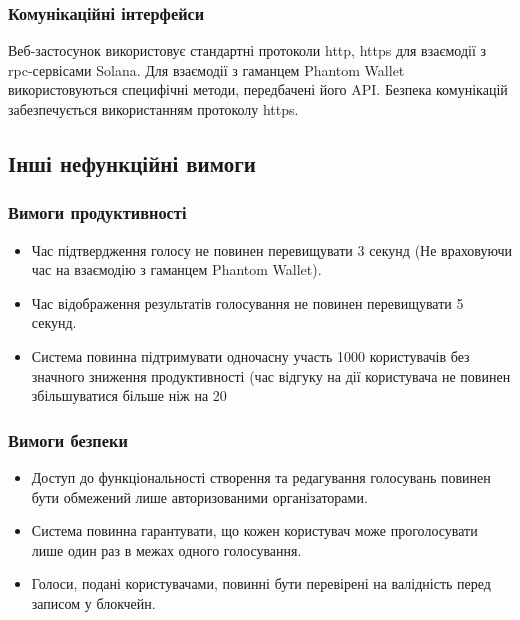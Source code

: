\documentclass[14pt]{extreport}
\begin{document}
  \subsubsection{Комунікаційні інтерфейси}
  Веб-застосунок використовує стандартні протоколи \gls{http}, \gls{https} для взаємодії з \gls{rpc}-сервісами Solana. Для взаємодії з гаманцем Phantom Wallet використовуються специфічні методи, передбачені його API. Безпека комунікацій забезпечується використанням протоколу \gls{https}.
  
  \subsection{Інші нефункційні вимоги}
  \subsubsection{Вимоги продуктивності}
  \begin{itemize}
    \item Час підтвердження голосу не повинен перевищувати 3 секунд (Не враховуючи час на взаємодію з гаманцем Phantom Wallet).
    \item Час відображення результатів голосування не повинен перевищувати 5 секунд.  
    \item Система повинна підтримувати одночасну участь 1000 користувачів без значного зниження продуктивності (час відгуку на дії користувача не повинен збільшуватися більше ніж на 20%
  \end{itemize}

  \subsubsection{Вимоги безпеки}
  \begin{itemize}
    \item Доступ до функціональності створення та редагування голосувань повинен бути обмежений лише авторизованими організаторами.
    \item Система повинна гарантувати, що кожен користувач може проголосувати лише один раз в межах одного голосування.
    \item Голоси, подані користувачами, повинні бути перевірені на валідність перед записом у блокчейн.
  \end{itemize}
  
\end{document}

